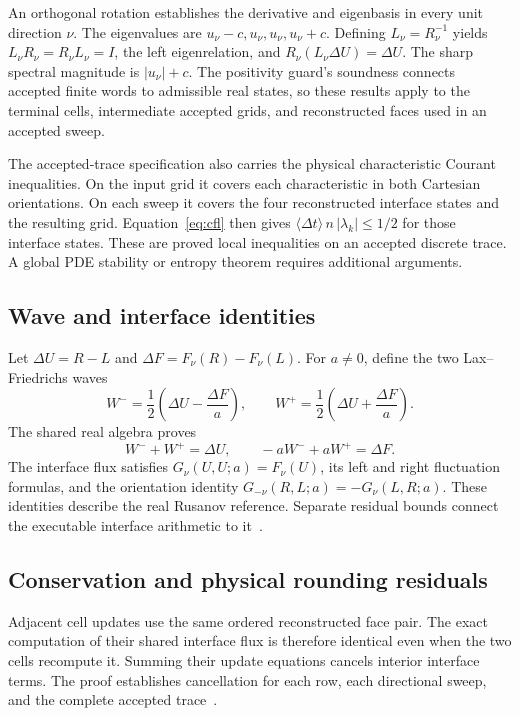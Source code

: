 \documentclass[11pt]{article}
\newcommand{\val}[1]{\langle #1\rangle}
\begin{document}
An orthogonal rotation establishes the derivative and eigenbasis in every unit direction $\nu$.  The eigenvalues are $u_\nu-c,u_\nu,u_\nu,u_\nu+c$.  Defining $L_\nu=R_\nu^{-1}$ yields $L_\nu R_\nu=R_\nu L_\nu=I$, the left eigenrelation, and $R_\nu(L_\nu\Delta U)=\Delta U$.  The sharp spectral magnitude is $|u_\nu|+c$.  The positivity guard's soundness connects accepted finite words to admissible real states, so these results apply to the terminal cells, intermediate accepted grids, and reconstructed faces used in an accepted sweep.

The accepted-trace specification also carries the physical characteristic Courant inequalities.  On the input grid it covers each characteristic in both Cartesian orientations.  On each sweep it covers the four reconstructed interface states and the resulting grid.  Equation~\eqref{eq:cfl} then gives $\val{\Delta t}\,n\,|\lambda_k|\leq1/2$ for those interface states.  These are proved local inequalities on an accepted discrete trace.  A global PDE stability or entropy theorem requires additional arguments.

\subsection{Wave and interface identities}

Let $\Delta U=R-L$ and $\Delta F=F_\nu(R)-F_\nu(L)$.  For $a\ne0$, define the two Lax--Friedrichs waves
\begin{equation}
W^- =\frac12\left(\Delta U-\frac{\Delta F}{a}\right),\qquad
W^+ =\frac12\left(\Delta U+\frac{\Delta F}{a}\right).
\end{equation}
The shared real algebra proves
\begin{equation}
W^-+W^+=\Delta U,\qquad -aW^-+aW^+=\Delta F.
\end{equation}
The interface flux satisfies $G_\nu(U,U;a)=F_\nu(U)$, its left and right fluctuation formulas, and the orientation identity $G_{-\nu}(R,L;a)=-G_\nu(L,R;a)$.  These identities describe the real Rusanov reference.  Separate residual bounds connect the executable interface arithmetic to it~\cite{waves}.

\subsection{Conservation and physical rounding residuals}

Adjacent cell updates use the same ordered reconstructed face pair.  The exact computation of their shared interface flux is therefore identical even when the two cells recompute it.  Summing their update equations cancels interior interface terms.  The proof establishes cancellation for each row, each directional sweep, and the complete accepted trace~\cite{balance}.
\end{document}
